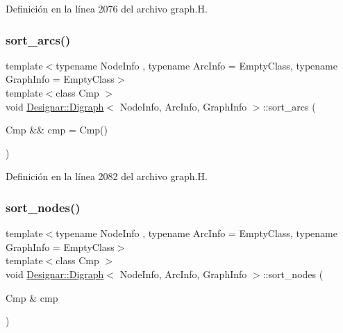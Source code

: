 Definición en la línea 2076 del archivo graph.\+H.

\mbox{\label{class_designar_1_1_digraph_a44895030e02896d6d35277eec136c49f}} 
\subsubsection{\texorpdfstring{sort\+\_\+arcs()}{sort\_arcs()}\hspace{0.1cm}{\footnotesize\ttfamily [2/2]}}
{\footnotesize\ttfamily template$<$typename Node\+Info , typename Arc\+Info  = Empty\+Class, typename Graph\+Info  = Empty\+Class$>$ \\
template$<$class Cmp $>$ \\
void \hyperlink{class_designar_1_1_digraph}{Designar\+::\+Digraph}$<$ Node\+Info, Arc\+Info, Graph\+Info $>$\+::sort\+\_\+arcs (\begin{DoxyParamCaption}\item[{Cmp \&\&}]{cmp = {\ttfamily Cmp()} }\end{DoxyParamCaption})\hspace{0.3cm}{\ttfamily [inline]}}



Definición en la línea 2082 del archivo graph.\+H.

\mbox{\label{class_designar_1_1_digraph_a5d057854409452b7d4fb2f9eec217b7d}} 
\subsubsection{\texorpdfstring{sort\+\_\+nodes()}{sort\_nodes()}\hspace{0.1cm}{\footnotesize\ttfamily [1/2]}}
{\footnotesize\ttfamily template$<$typename Node\+Info , typename Arc\+Info  = Empty\+Class, typename Graph\+Info  = Empty\+Class$>$ \\
template$<$class Cmp $>$ \\
void \hyperlink{class_designar_1_1_digraph}{Designar\+::\+Digraph}$<$ Node\+Info, Arc\+Info, Graph\+Info $>$\+::sort\+\_\+nodes (\begin{DoxyParamCaption}\item[{Cmp \&}]{cmp }\end{DoxyParamCaption})\hspace{0.3cm}{\ttfamily [inline]}}



